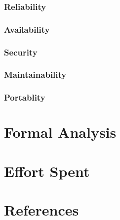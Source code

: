 \documentclass[12pt,a4paper]{report}
\begin{document}
		\subsection{Reliability}
		\subsection{Availability}
		\subsection{Security}
		\subsection{Maintainability}
		\subsection{Portablity}

\chapter{Formal Analysis}

\chapter{Effort Spent}

\chapter{References}
\end{document}
